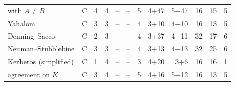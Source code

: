 \begin{table}[tbp]
\begin{tabular}{l c r r r r r r r r r r}
\quad with $A \neq B$ & C & 4 & 4 & -- & -- & 5 & 4{+}47 & 5{+}47 & 16 & 15 & 5\\
Yahalom & C & 3 & 3 & -- & -- & 4 & 3{+}10 & 4{+}10 & 16 & 13 & 5\\
Denning--Sacco & C & 2 & 3 & -- & -- & 4 & 3{+}37 & 4{+}11 & 32 & 17 & 6\\
Neuman--Stubblebine & C & 3 & 3 & -- & -- & 4 & 3{+}13 & 4{+}13 & 32 & 25 & 6\\
Kerberos (simplified) & C & 1 & 4 & -- & -- & 3 & 4{+}20 & 3{+}6 & 16 & 16 & 1\\
\quad agreement on $K$ & C & 3 & 4 & -- & -- & 5 & 4{+}16 & 5{+}12 & 16 & 13 & 5\\
\bottomrule
\end{tabular}
\end{table}
